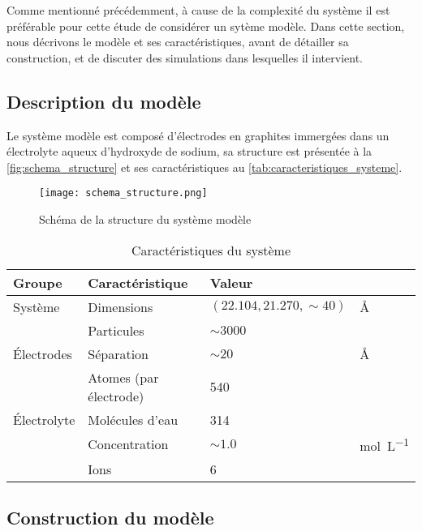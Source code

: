 Comme mentionné précédemment, à cause de la complexité du système il est préférable pour cette étude de considérer un sytème modèle. Dans cette section, nous décrivons le modèle et ses caractéristiques, avant de détailler sa construction, et de discuter des simulations dans lesquelles il intervient.

    \subsection{Description du modèle}

Le système modèle est composé d'électrodes en graphites immergées dans un électrolyte aqueux d'hydroxyde de sodium, sa structure est présentée à la \autoref{fig:schema_structure} et ses caractéristiques au \autoref{tab:caracteristiques_systeme}.

\begin{figure}[h!]
    \centering
    \texttt{[image: schema\_structure.png]}
    \caption{Schéma de la structure du système modèle}
    \label{fig:schema_structure}
\end{figure}

\begin{table}[h!]
    \centering
    \begin{tabular}{l || l | l l}
        \hline
        Groupe &Caractéristique &Valeur &\\
        \hline
        Système &Dimensions &$(22.104, 21.270, \sim 40)$ &\unit{\angstrom}\\
        &Particules &$\sim \num{3000}$ &\\
        \hline
        Électrodes &Séparation &$\sim \num{20}$ &\unit{\angstrom}\\
        &Atomes (par électrode) &\num{540} &\\
        \hline
        Électrolyte &Molécules d'eau &\num{314} &\\
        &Concentration &$\sim \num{1.0}$ &\unit{\mole \per \liter}\\
        &Ions &\num{6} &\\
        \hline
    \end{tabular}
    \caption{Caractéristiques du système}
    \label{tab:caracteristiques_systeme}
\end{table}

    \subsection{Construction du modèle}

